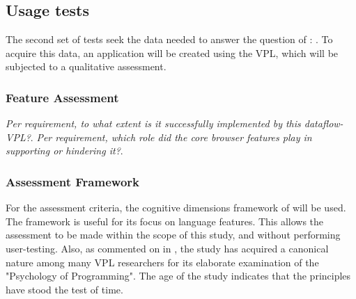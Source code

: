 


\subsection{Usage tests}

The second set of tests seek the data needed to answer the question of \mySubRQFourTitle: \mySubRQFour.
To acquire this data, an application will be created using the VPL, which will be subjected to a qualitative assessment. 

\subsubsection{Feature Assessment}

\emph{Per requirement, to what extent is it successfully implemented by this dataflow-VPL?}.
\emph{Per requirement, which role did the core browser features play in supporting or hindering it?}.

\subsubsection{Assessment Framework}
For the assessment criteria, the cognitive dimensions framework of \cite[]{green_usability_1996} will be used. 
The framework is useful for its focus on language features. 
This allows the assessment to be made within the scope of this study, and without performing user-testing.
Also, as commented on in , the study has acquired a canonical nature among many VPL researchers for its elaborate examination of the "Psychology of Programming".
The age of the study indicates that the principles have stood the test of time. 

